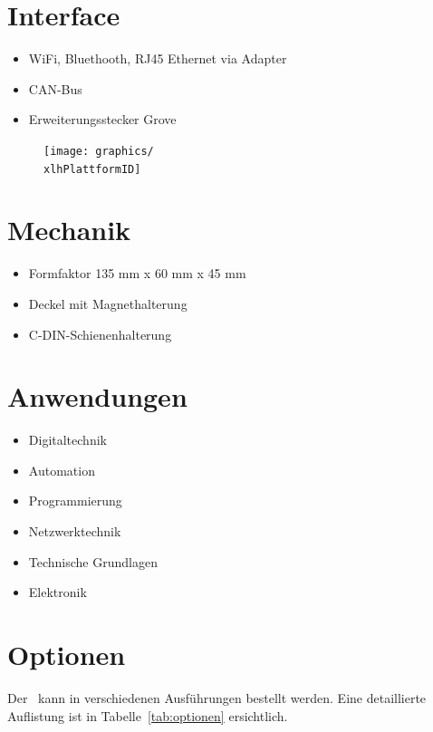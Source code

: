 \documentclass[10pt]{datasheet}
\begin{document}
\section{Interface}

\begin{itemize}
    \item WiFi, Bluethooth, RJ45 Ethernet via Adapter
    \item CAN-Bus
    \item Erweiterungsstecker Grove
\end{itemize}

\vfill\break

\begin{figure}[h]
    \centering
    \texttt{[image: graphics/\\xlhPlattformID]}
\end{figure}

\section{Mechanik}

\begin{itemize}
    \item Formfaktor 135 mm x 60 mm x 45 mm
    \item Deckel mit Magnethalterung
    \item C-DIN-Schienenhalterung
\end{itemize}

\section{Anwendungen}

\begin{itemize}
    \item Digitaltechnik
    \item Automation
    \item Programmierung
    \item Netzwerktechnik
    \item Technische Grundlagen
    \item Elektronik
\end{itemize}

\vfill\break


\onecolumn

\section{Optionen}
Der \xlhPlattformID\ kann in verschiedenen Ausführungen bestellt werden.
Eine detaillierte Auflistung ist in Tabelle~\ref{tab:optionen} ersichtlich.
\end{document}
